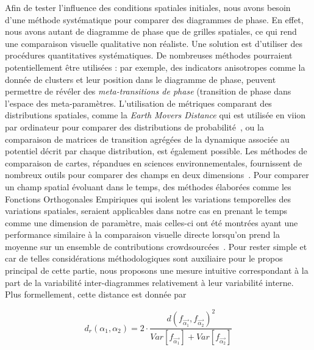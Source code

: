 {Afin de tester l'influence des conditions spatiales initiales, nous avons besoin d'une méthode systématique pour comparer des diagrammes de phase. En effet, nous avons autant de diagramme de phase que de grilles spatiales, ce qui rend une comparaison visuelle qualitative non réaliste. Une solution est d'utiliser des procédures quantitatives systématiques. De nombreuses méthodes pourraient potentiellement être utilisées : par exemple, des indicators anisotropes comme la donnée de clusters et leur position dans le diagramme de phase, peuvent permettre de révéler des \emph{meta-transitions de phase} (transition de phase dans l'espace des meta-paramètres. L'utilisation de métriques comparant des distributions spatiales, comme la \emph{Earth Movers Distance} qui est utilisée en viion par ordinateur pour comparer des distributions de probabilité~\cite{rubner2000earth}, ou la comparaison de matrices de transition agrégées de la dynamique associée au potentiel décrit par chaque distribution, est également possible. Les méthodes de comparaison de cartes, répandues en sciences environnementales, fournissent de nombreux outils pour comparer des champs en deux dimensions~\cite{visser2006map}. Pour comparer un champ spatial évoluant dans le temps, des méthodes élaborées comme les Fonctions Orthogonales Empiriques qui isolent les variations temporelles des variations spatiales, seraient applicables dans notre cas en prenant le temps comme une dimension de paramètre, mais celles-ci ont été montrées ayant une performance similaire à la comparaison visuelle directe lorsqu'on prend la moyenne sur un ensemble de contributions crowdsourcées~\cite{10.1371/journal.pone.0178165}. Pour rester simple et car de telles considérations méthodologiques sont auxiliaire pour le propos principal de cette partie, nous proposons une mesure intuitive correspondant à la part de la variabilité inter-diagrammes relativement à leur variabilité interne. Plus formellement, cette distance est donnée par
}

\begin{equation}\label{eq:phase-distance}
d_r\left(\alpha_1,\alpha_2\right) = 2 \cdot \frac{d(f_{\vec{\alpha_1}},f_{\vec{\alpha_2}})^2}{Var\left[f_{\vec{\alpha_1}}\right] + Var\left[f_{\vec{\alpha_2}}\right]}
\end{equation}

